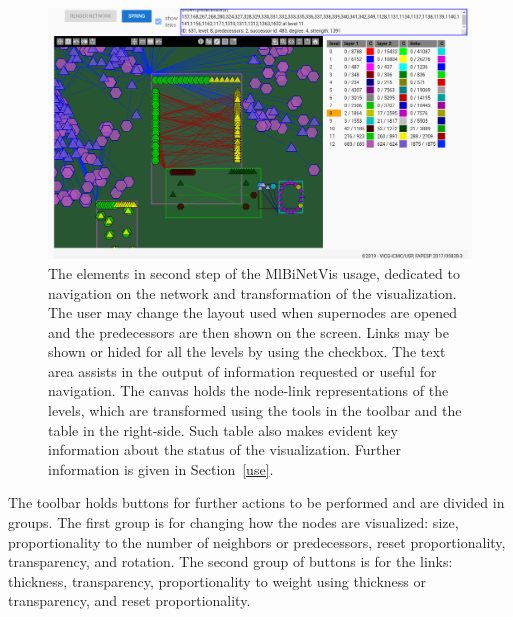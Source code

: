 \documentclass[runningheads]{llncs}
\begin{document}
\begin{figure}[!h]\centering
 \includegraphics[width=\textwidth]{secondPhase}
  \caption{The elements in second step of the MlBiNetVis usage, dedicated to navigation on the network and transformation of the visualization.
  The user may change the layout used when supernodes are opened and the predecessors are then shown on the screen.
  Links may be shown or hided for all the levels by using the checkbox.
  The text area assists in the output of information requested or useful for navigation.
  The canvas holds the node-link representations of the levels, which are transformed using the tools in the toolbar and the table in the right-side.
  Such table also makes evident key information about the status of the visualization.
  Further information is given in Section~\ref{use}.
  }\label{secondPhase}
\end{figure}

The toolbar holds buttons for further actions to be performed and are divided in groups.
The first group is for changing how the nodes are visualized: size, proportionality to
the number of neighbors or predecessors, reset proportionality, transparency, and rotation.
The second group of buttons is for the links: thickness, transparency, proportionality to weight
using thickness or transparency, and reset proportionality.
\end{document}
